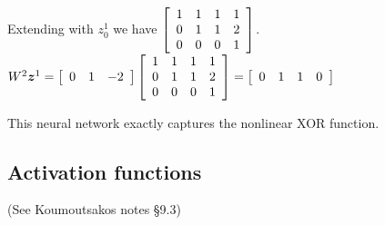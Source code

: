 \documentclass[12pt,letterpaper,noanswers]{exam}
\newcommand{\vc}[1]{\boldsymbol{#1}}
\begin{document}
\noindent  Extending with $z_0^1$ we have $\left[\begin{array}{r r r r}
1 & 1 & 1 & 1\\
0 & 1 & 1 & 2 \\
0 & 0 & 0 & 1\end{array}\right]$.  $W^2\vc{z}^1 = \left[\begin{array}{r r r} 0 & 1 & -2\end{array}\right]\left[\begin{array}{r r r r}
1 & 1 & 1 & 1\\
0 & 1 & 1 & 2 \\
0 & 0 & 0 & 1\end{array}\right] = \left[\begin{array}{r r r r} 
0 & 1 & 1 & 0
\end{array}\right]$

\noindent  This neural network exactly captures the nonlinear XOR function.

\subsection*{Activation functions}

(See Koumoutsakos notes \S 9.3)
\end{document}
